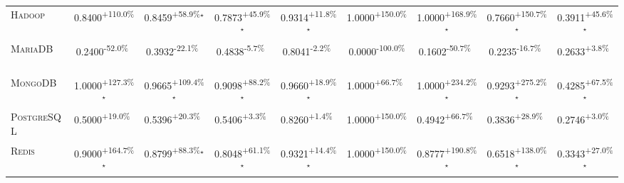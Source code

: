 \begin{table}[htbp]
\begin{tabular}{l|cccc|cccc}
\textsc{Hadoop} & \cellcolor{green!30}0.8400\textsuperscript{+110.0\%}$^{\,\,\,}$ & \cellcolor{green!30}0.8459\textsuperscript{+58.9\%}$^\star$ & \cellcolor{green!30}0.7873\textsuperscript{+45.9\%}$^\star$ & \cellcolor{green!30}0.9314\textsuperscript{+11.8\%}$^\star$ & \cellcolor{green!30}1.0000\textsuperscript{+150.0\%}$^{\,\,\,}$ & \cellcolor{green!30}1.0000\textsuperscript{+168.9\%}$^\star$ & \cellcolor{green!30}0.7660\textsuperscript{+150.7\%}$^\star$ & \cellcolor{green!30}0.3911\textsuperscript{+45.6\%}$^\star$ \\
\textsc{MariaDB} & \cellcolor{red!30}0.2400\textsuperscript{-52.0\%}$^{\,\,\,}$ & \cellcolor{red!30}0.3932\textsuperscript{-22.1\%}$^{\,\,\,}$ & \cellcolor{red!30}0.4838\textsuperscript{-5.7\%}$^{\,\,\,}$ & \cellcolor{red!30}0.8041\textsuperscript{-2.2\%}$^{\,\,\,}$ & \cellcolor{red!30}0.0000\textsuperscript{-100.0\%}$^{\,\,\,}$ & \cellcolor{red!30}0.1602\textsuperscript{-50.7\%}$^{\,\,\,}$ & \cellcolor{red!30}0.2235\textsuperscript{-16.7\%}$^{\,\,\,}$ & \cellcolor{green!30}0.2633\textsuperscript{+3.8\%}$^{\,\,\,}$ \\
\textsc{MongoDB} & \cellcolor{green!30}1.0000\textsuperscript{+127.3\%}$^\star$ & \cellcolor{green!30}0.9665\textsuperscript{+109.4\%}$^\star$ & \cellcolor{green!30}0.9098\textsuperscript{+88.2\%}$^\star$ & \cellcolor{green!30}0.9660\textsuperscript{+18.9\%}$^\star$ & \cellcolor{green!30}1.0000\textsuperscript{+66.7\%}$^{\,\,\,}$ & \cellcolor{green!30}1.0000\textsuperscript{+234.2\%}$^\star$ & \cellcolor{green!30}0.9293\textsuperscript{+275.2\%}$^\star$ & \cellcolor{green!30}0.4285\textsuperscript{+67.5\%}$^\star$ \\
\textsc{PostgreSQL} & \cellcolor{green!30}0.5000\textsuperscript{+19.0\%}$^{\,\,\,}$ & \cellcolor{green!30}0.5396\textsuperscript{+20.3\%}$^{\,\,\,}$ & \cellcolor{green!30}0.5406\textsuperscript{+3.3\%}$^{\,\,\,}$ & \cellcolor{green!30}0.8260\textsuperscript{+1.4\%}$^{\,\,\,}$ & \cellcolor{green!30}1.0000\textsuperscript{+150.0\%}$^{\,\,\,}$ & \cellcolor{green!30}0.4942\textsuperscript{+66.7\%}$^{\,\,\,}$ & \cellcolor{green!30}0.3836\textsuperscript{+28.9\%}$^{\,\,\,}$ & \cellcolor{green!30}0.2746\textsuperscript{+3.0\%}$^{\,\,\,}$ \\
\textsc{Redis} & \cellcolor{green!30}0.9000\textsuperscript{+164.7\%}$^\star$ & \cellcolor{green!30}0.8799\textsuperscript{+88.3\%}$^\star$ & \cellcolor{green!30}0.8048\textsuperscript{+61.1\%}$^\star$ & \cellcolor{green!30}0.9321\textsuperscript{+14.4\%}$^\star$ & \cellcolor{green!30}1.0000\textsuperscript{+150.0\%}$^{\,\,\,}$ & \cellcolor{green!30}0.8777\textsuperscript{+190.8\%}$^\star$ & \cellcolor{green!30}0.6518\textsuperscript{+138.0\%}$^\star$ & \cellcolor{green!30}0.3343\textsuperscript{+27.0\%}$^\star$ \\

\end{tabular}
\end{table}
